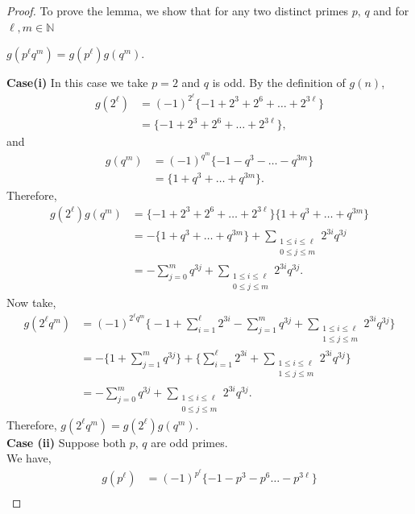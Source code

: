 \documentclass[10pt,a4paper]{amsart}
\begin{document}
\begin{proof}
	To prove the lemma, we show that for any two distinct primes $p,\,q$ and for $\ell,m \in \mathbb{N}$
	\begin{center}
		$g(p^{\ell}q^{m})=g(p^{\ell})g(q^{m})$.
	\end{center}
	\textbf{Case(i)} In this case we take $p=2$ and $q$ is odd. By the definition of $g(n)$,
	\begin{align*}
		g(2^{\ell})&=(-1)^{2^{\ell}}\{-1+2^{3}+2^{6}+\dots+2^{3\ell}\}\\
		&=\{-1+2^{3}+2^{6}+\dots+2^{3\ell}\},
	\end{align*}
	and 
	\begin{align*}
		g(q^{m})&=(-1)^{q^{m}}\{-1-q^{3}-\dots-q^{3m}\}\\
		&=\{1+q^{3}+\dots+q^{3m}\}.
	\end{align*}
	Therefore,
	\begin{align*}
		g(2^{\ell})g(q^{m})&=\{-1+2^{3}+2^{6}+\dots+2^{3\ell}\}\{1+q^{3}+\dots+q^{3m}\}\\
		&=-\{1+q^{3}+\dots+q^{3m}\}+\sum\limits_{\substack{1\leq i\leq \ell \\ 0\leq j \leq m}} 2^{3i} q^{3j}\\
		&=-\sum\limits_{j=0}^{m}q^{3j}+\sum\limits_{\substack{1\leq i\leq \ell \\ 0\leq j \leq m}} 2^{3i} q^{3j}.
	\end{align*}
	Now take,
	\begin{align*}
		g(2^{\ell}q^{m})&=(-1)^{2^{\ell}q^{m}}\big\{-1+\sum\limits_{i=1}^{\ell}2^{3i}-\sum\limits_{j=1}^{m}q^{3j}+\sum\limits_{\substack{1\leq i\leq \ell \\ 1\leq j \leq m}} 2^{3i} q^{3j}\big\}\\
		&=-\big\{1+\sum\limits_{j=1}^{m}q^{3j}\big\}+\big\{\sum\limits_{i=1}^{\ell}2^{3i}+ \sum\limits_{\substack{1\leq i\leq \ell \\ 1\leq j \leq m}} 2^{3i} q^{3j}\big\}\\
		&=-\sum\limits_{j=0}^{m}q^{3j}+\sum\limits_{\substack{1\leq i\leq \ell \\ 0\leq j \leq m}} 2^{3i} q^{3j}.
	\end{align*}
	Therefore, $g(2^{\ell}q^{m})=g(2^{\ell})g(q^{m})$.\vspace{3mm}\\
	\textbf{Case (ii)} Suppose both $p,\,q$ are odd primes.\\
	We have,
	\begin{align*}
		g(p^{\ell})&=(-1)^{p^{\ell}}\{-1-p^{3}-p^{6}\dots-p^{3\ell}\}\\

\end{align*}
\end{proof}
\end{document}
